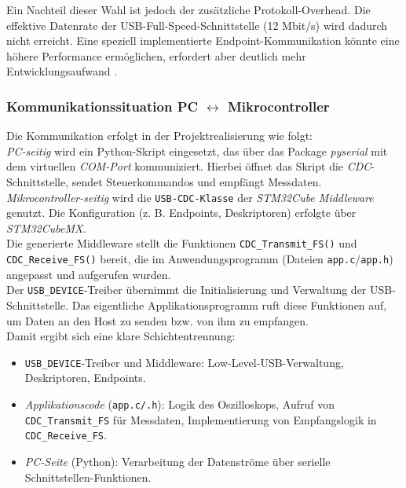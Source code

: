 \documentclass[a4paper, portrait, 12pt]{scrartcl} %
\begin{document}
Ein Nachteil dieser Wahl ist jedoch der zusätzliche Protokoll-Overhead. Die effektive Datenrate der USB-Full-Speed-Schnittstelle (12 Mbit/s) wird dadurch nicht erreicht. Eine speziell implementierte Endpoint-Kommunikation könnte eine höhere Performance ermöglichen, erfordert aber deutlich mehr Entwicklungsaufwand \cite{STmicroelectronics2019}.

\subsubsection{Kommunikationssituation PC $\leftrightarrow$ Mikrocontroller}

Die Kommunikation erfolgt in der Projektrealisierung wie folgt:\\
\emph{PC-seitig} wird ein Python-Skript eingesetzt, das über das Package \emph{pyserial} mit dem virtuellen \emph{COM-Port} kommuniziert. Hierbei öffnet das Skript die \emph{CDC}-Schnittstelle, sendet Steuerkommandos und empfängt Messdaten.\\
\emph{Mikrocontroller-seitig} wird die \texttt{USB-CDC-Klasse} der \emph{STM32Cube Middleware} genutzt. Die Konfiguration (z. B. Endpoints, Deskriptoren) erfolgte über \emph{STM32CubeMX}.\\
Die generierte Middleware stellt die Funktionen \texttt{CDC\_Transmit\_FS()} und \texttt{CDC\_Receive\_FS()} bereit, die im Anwendungsprogramm (Dateien \texttt{app.c}/\texttt{app.h}) angepasst und aufgerufen wurden.\\
Der \texttt{USB\_DEVICE}-Treiber übernimmt die Initialisierung und Verwaltung der USB-Schnittstelle. Das eigentliche Applikationsprogramm ruft diese Funktionen auf, um Daten an den Host zu senden bzw. von ihm zu empfangen.\\

Damit ergibt sich eine klare Schichtentrennung:
\begin{itemize}
    \item \texttt{USB\_DEVICE}-Treiber und Middleware: Low-Level-USB-Verwaltung, Deskriptoren, Endpoints.
    \item \emph{Applikationscode} (\texttt{app.c/.h}): Logik des Oszilloskops, Aufruf von \texttt{CDC\_Transmit\_FS} für Messdaten, Implementierung von Empfangslogik in \texttt{CDC\_Receive\_FS}.
    \item \emph{PC-Seite} (Python): Verarbeitung der Datenströme über serielle Schnittstellen-Funktionen.
\end{itemize}

\pagebreak
\end{document}
